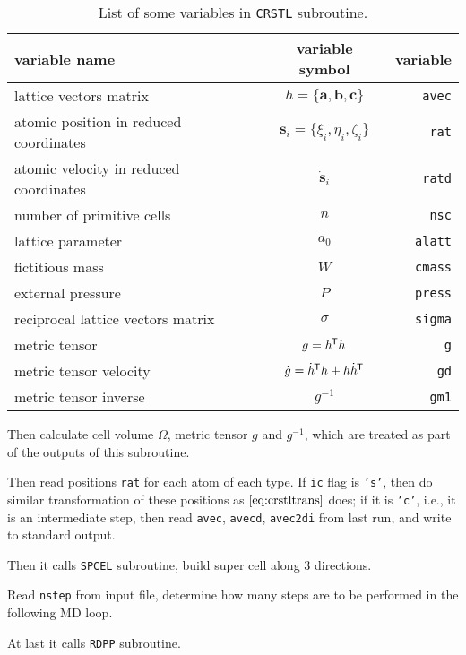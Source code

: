 \begin{table}[h]
	\centering
	\caption{List of some variables in \texttt{CRSTL} subroutine.}
	\begin{tabular}{@{}lcr@{}}
		\toprule
		variable name                          & variable symbol                                 & variable       \\
		\midrule
		lattice vectors matrix                 & $h = \{ \bm{a}, \bm{b}, \bm{c} \}$              & \texttt{avec}  \\
		atomic position in reduced coordinates & $\bm{s}_i = \{\xi_i, \eta_i, \zeta_i\}$         & \texttt{rat}   \\
		atomic velocity in reduced coordinates & $\dot{ \bm{s} }_i$                              & \texttt{ratd}  \\
		number of primitive cells              & $n$                                             & \texttt{nsc}   \\
		lattice parameter                      & $a_0$                                           & \texttt{alatt} \\
		fictitious mass                        & $W$                                             & \texttt{cmass} \\
		external pressure                      & $P$                                             & \texttt{press} \\
		reciprocal lattice vectors matrix      & $\sigma$                                        & \texttt{sigma} \\
		metric tensor                          & $g = h ^{\mkern-1.5mu\mathsf{T}} h$                                 & \texttt{g}     \\
		metric tensor velocity                 & $\dot{g} = \dot{ h }^{\mkern-1.5mu\mathsf{T}} h + h \dot{ h }^{\mkern-1.5mu\mathsf{T}}$ & \texttt{gd}    \\
		metric tensor inverse                  & $g^{-1}$                                        & \texttt{gm1}   \\
		\bottomrule
	\end{tabular}%
	\label{tab:crstl}%
\end{table}%

Then calculate cell volume $\Omega$, metric tensor $g$ and $g^{-1}$, which are
treated as part of the outputs of this subroutine.

Then read positions \texttt{rat} for each atom of each type.
If \texttt{ic} flag is \texttt{'s'},
then do similar transformation of these positions as $\eqref{eq:crstltrans}$ does;
if it is \texttt{'c'}, i.e., it is an intermediate step, then read
\texttt{avec}, \texttt{avecd}, \texttt{avec2di} from last run,
and write to standard output.

Then it calls \texttt{SPCEL} subroutine, build super cell along $3$ directions.

Read \texttt{nstep} from input file, determine how many steps are
to be performed in the following MD loop.

At last it calls \texttt{RDPP} subroutine.